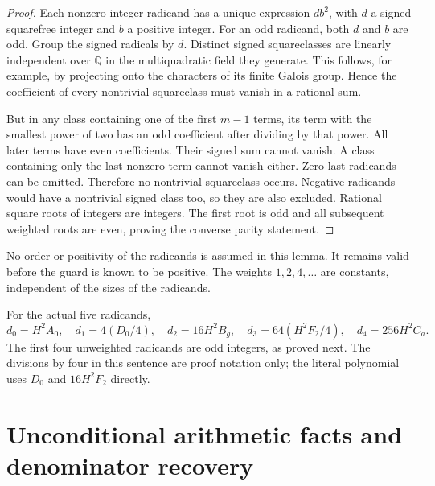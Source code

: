 \documentclass[11pt]{article}
\newcommand{\Q}{\mathbb Q}
\theoremstyle{remark}
\begin{document}
\begin{proof}
Each nonzero integer radicand has a unique expression \(d b^2\), with
\(d\) a signed squarefree integer and \(b\) a positive integer.
For an odd radicand, both \(d\) and \(b\) are odd.
Group the signed radicals by \(d\). Distinct signed squareclasses are
linearly independent over \(\Q\) in the multiquadratic field they generate.
This follows, for example, by projecting onto the characters of its finite
Galois group. Hence the coefficient of every nontrivial squareclass must
vanish in a rational sum.

But in any class containing one of the first \(m-1\) terms, its term with
the smallest power of two has an odd coefficient after dividing by that
power. All later terms have even coefficients. Their signed sum cannot
vanish. A class containing only the last nonzero term cannot vanish either.
Zero last radicands can be omitted. Therefore no nontrivial squareclass
occurs. Negative radicands would have a nontrivial signed class too, so
they are also excluded. Rational square roots of integers are integers.
The first root is odd and all subsequent weighted roots are even, proving
the converse parity statement.
\end{proof}

No order or positivity of the radicands is assumed in this lemma.
It remains valid before the guard is known to be positive.
The weights \(1,2,4,\ldots\) are constants, independent of the sizes of
the radicands.

For the actual five radicands,
\[
 d_0=H^2A_0,\quad
 d_1=4(D_0/4),\quad
 d_2=16H^2B_g,\quad
 d_3=64(H^2F_2/4),\quad
 d_4=256H^2C_a.
\]
The first four unweighted radicands are odd integers, as proved next.
The divisions by four in this sentence are proof notation only; the
literal polynomial uses \(D_0\) and \(16H^2F_2\) directly.

\section{Unconditional arithmetic facts and denominator recovery}
\end{document}
